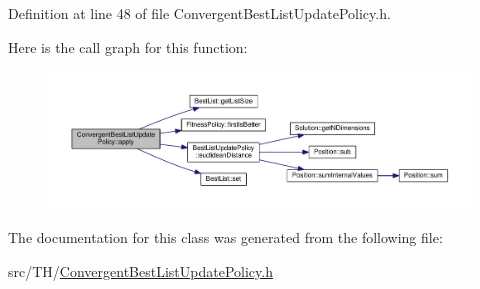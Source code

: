 Definition at line 48 of file Convergent\+Best\+List\+Update\+Policy.\+h.



Here is the call graph for this function\+:\nopagebreak
\begin{figure}[H]
\begin{center}
\leavevmode
\includegraphics[width=350pt]{classConvergentBestListUpdatePolicy_a6382937d32ac8bab7169f216fcd3048f_cgraph}
\end{center}
\end{figure}




The documentation for this class was generated from the following file\+:\begin{DoxyCompactItemize}
\item 
src/\+T\+H/\hyperlink{ConvergentBestListUpdatePolicy_8h}{Convergent\+Best\+List\+Update\+Policy.\+h}\end{DoxyCompactItemize}

